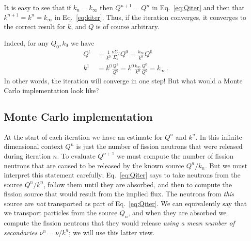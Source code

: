 \documentclass[12pt]{article}
\begin{document}
It is easy to see that if $k_n = k_\infty$ then $Q^{n+1} = Q^n$ in Eq.~\ref{eq:Qiter} and then that $k^{n+1} = k^n = k_\infty$ in Eq.~\ref{eq:kiter}.  Thus, if the iteration converges, it converges to the correct result for $k$, and $Q$ is of course arbitrary.

Indeed, for any $Q_0, k_0$ we have
\begin{align}
Q^{1} &= \frac{1}{k^0} \frac{\nu\Sigma_f}{\Sigma_a} Q^0 = \frac{k_\infty}{k^0} Q^0\\
k^{1} &= k^0 \frac{Q^{1}}{Q^0} = k^0 \frac{k_\infty}{k^0} \frac{Q^0}{Q^0} = k_\infty \,.
\end{align}
In other words, the iteration will converge in one step! But what would a Monte Carlo implementation look like?

\subsection{Monte Carlo implementation}

At the start of each iteration we have an estimate for $Q^n$ and $k^n$.  In this infinite dimensional context $Q^n$ is just the number of fission neutrons that were released during iteration $n$.  To evaluate $Q^{n+1}$ we must compute the number of fission neutrons that are caused to be released by the known source $Q^n/k_n$.  But we must interpret this statement carefully; Eq.~\ref{eq:Qiter} says to take neutrons from the source $Q^n/k^n$, follow them until they are absorbed, and then to compute the fission source that would result from the implied flux.   The neutrons from \emph{this} source are \emph{not} transported as part of Eq.~\ref{eq:Qiter}.  We can equivalently say that we transport particles from the source $Q_n$, and when they are absorbed we compute the fission neutrons that they would release \emph{using a mean number of secondaries $\nu^n = \nu/k^n$}; we will use this latter view.
\end{document}
